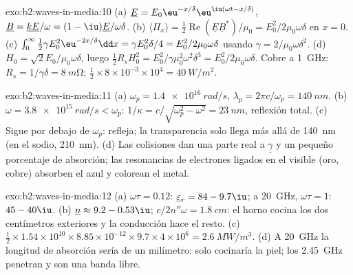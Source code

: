 \begin{solution}{exo:b2:waves-in-media:10}
(a) $\underline E = E_0\eu^{-x/\delta}\eu^{\iu(\omega t - x/\delta)}$, $\underline B = \underline k\underline E/\omega
= (1 - \iu)\underline E/\omega\delta$. (b) $\langle\Pi_x\rangle = \tfrac12\operatorname{Re}(\underline E
\underline B^*)/\mu_0 = E_0^2/2\mu_0\omega\delta$ en $x = 0$. (c) $\int_0^\infty\tfrac12\gamma E_0^2
\eu^{-2x/\delta}\dd x = \gamma E_0^2\delta/4 = E_0^2/2\mu_0\omega\delta$ usando $\gamma = 2/\mu_0\omega\delta^2$.
(d) $H_0 = \sqrt2E_0/\mu_0\omega\delta$, luego $\tfrac12R_sH_0^2 = E_0^2/\gamma\mu_0^2\omega^2\delta^3 =
E_0^2/2\mu_0\omega\delta$. Cobre a \qty{1}{GHz}: $R_s = 1/\gamma\delta = \qty{8}{m\ohm}$;
$\tfrac12 \times 8 \times 10^{-3} \times 10^4 = \qty{40}{W/m^2}$.
\end{solution}

\begin{solution}{exo:b2:waves-in-media:11}
(a) $\omega_p = \qty{1.4e16}{rad/s}$, $\lambda_p = 2\pi c/\omega_p = \qty{140}{nm}$. (b) $\omega = \qty{3.8e15}{rad/s}
< \omega_p$: $1/\kappa = c/\sqrt{\omega_p^2 - \omega^2} = \qty{23}{nm}$, reflexión total. (c)
Sigue por debajo de $\omega_p$: refleja; la transparencia solo llega más allá de \qty{140}{nm} (en
el sodio, \qty{210}{nm}). (d) Las colisiones dan una parte real a $\underline\gamma$ y
un pequeño porcentaje de absorción; las resonancias de electrones ligados en el visible
(oro, cobre) absorben el azul y colorean el metal.
\end{solution}

\begin{solution}{exo:b2:waves-in-media:12}
(a) $\omega\tau = 0.12$: $\underline\varepsilon_r = 84 - 9.7\iu$; a \qty{20}{GHz}, $\omega\tau = 1$:
$45 - 40\iu$. (b) $\underline n \approx 9.2 - 0.53\iu$; $c/2n''\omega = \qty{1.8}{cm}$: el horno
cocina los dos centímetros exteriores y la conducción hace el resto. (c) $\tfrac12 \times
1.54 \times 10^{10} \times 8.85 \times 10^{-12} \times 9.7 \times 4 \times 10^6 = \qty{2.6}{MW/m^3}$. (d) A
\qty{20}{GHz} la longitud de absorción sería de un milímetro: solo cocinaría la
piel; los \qty{2.45}{GHz} penetran y son una banda libre.
\end{solution}

